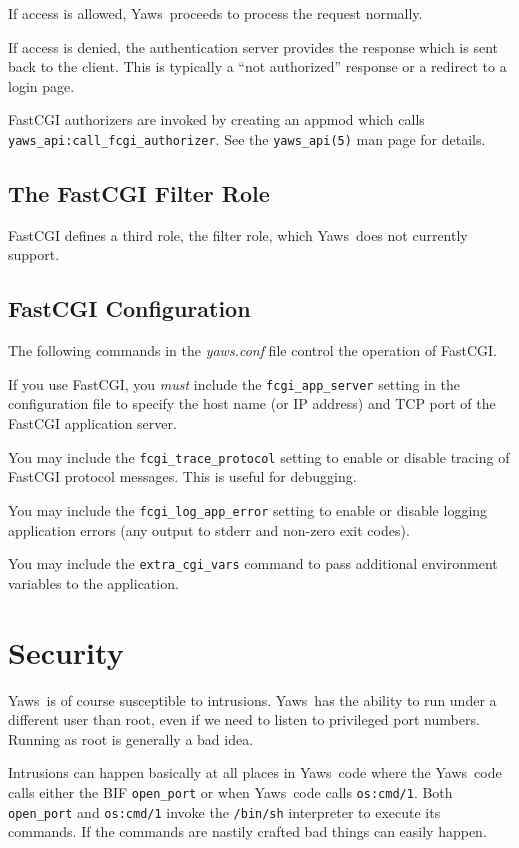 \documentclass[11pt,oneside,english]{book}
\newcommand{\Yaws}            %
        {{\sc Yaws}}
\begin{document}
If access is allowed, \Yaws\ proceeds to process the request normally.

If access is denied, the authentication server provides the
response which is sent back to the client. This is typically
a ``not authorized'' response or a redirect to a login page.

FastCGI authorizers are invoked by creating an appmod which
calls \verb+yaws_api:call_fcgi_authorizer+.
See the \verb+yaws_api(5)+ man page for details.

\section{The FastCGI Filter Role}

FastCGI defines a third role, the filter role, which
\Yaws\  does not currently support.


\section{FastCGI Configuration}

The following commands in the \textit{yaws.conf} file control the
operation of FastCGI.

If you use FastCGI, you \emph{must} include the \verb+fcgi_app_server+
setting in the configuration file to specify the host name (or IP address)
and TCP port of the FastCGI application server.

You may include the \verb+fcgi_trace_protocol+ setting to enable or disable
tracing of FastCGI protocol messages. This is useful for debugging.

You may include the \verb+fcgi_log_app_error+ setting to enable or disable
logging application errors (any output to stderr and non-zero exit codes).

You may include the \verb+extra_cgi_vars+ command to pass additional
environment variables to the application.


\chapter{Security}

\Yaws\  is of course susceptible to intrusions. \Yaws\  has the
ability to run under a different user than root, even if we need
to listen to privileged port numbers. Running as root is generally a
bad idea.

Intrusions can happen basically at all places in \Yaws\ code where the
\Yaws\ code calls either the BIF \verb+open_port+ or when \Yaws\ code
calls \verb+os:cmd/1+. Both \verb+open_port+ and \verb+os:cmd/1+
invoke the \verb+/bin/sh+ interpreter to execute its commands. If the
commands are nastily crafted bad things can easily happen.
\end{document}
